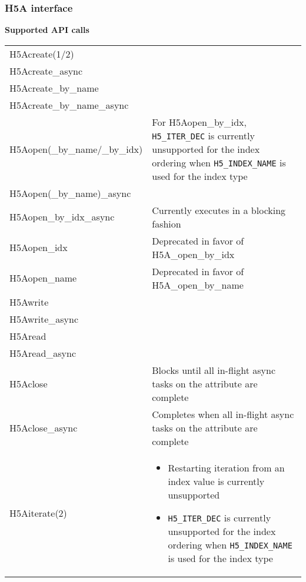 \documentclass[../users_guide.tex]{subfiles}
\begin{document}
\newpage

\subsubsection{H5A interface}

\begin{center}

\textbf{Supported API calls}
\vspace{.2in} \\

\begin{tabularx}{\linewidth}{| X | >{\RaggedRight}X |}
\hline
\rowcolor{lightgray!50}%
\multicolumn{1}{| c |}{\textbf{API call}} & \multicolumn{1}{c |}{\textbf{Notes}} \\ \hline

H5Acreate(1/2) & \\ \hline
H5Acreate\_async & \\ \hline
H5Acreate\_by\_name & \\ \hline
H5Acreate\_by\_name\_async & \\ \hline
H5Aopen(\_by\_name/\_by\_idx) & For H5Aopen\_by\_idx, \texttt{H5\_ITER\_DEC} is currently unsupported for the index ordering when \texttt{H5\_INDEX\_NAME} is used for the index type\\ \hline
H5Aopen(\_by\_name)\_async & \\ \hline
H5Aopen\_by\_idx\_async & Currently executes in a blocking fashion\\ \hline
H5Aopen\_idx & Deprecated in favor of H5A\_open\_by\_idx\\ \hline
H5Aopen\_name & Deprecated in favor of H5A\_open\_by\_name\\ \hline
H5Awrite & \\ \hline
H5Awrite\_async & \\ \hline
H5Aread & \\ \hline
H5Aread\_async & \\ \hline
H5Aclose & Blocks until all in-flight async tasks on the attribute are complete\\ \hline
H5Aclose\_async & Completes when all in-flight async tasks on the attribute are complete\\ \hline
H5Aiterate(2) & \begin{itemize}
                    \item Restarting iteration from an index value is currently unsupported\footnotemark[1]
                    \item \texttt{H5\_ITER\_DEC} is currently unsupported for the index ordering when \texttt{H5\_INDEX\_NAME} is used for the index type
                \end{itemize}\\ \hline


\end{tabularx}
\end{center}
\end{document}
